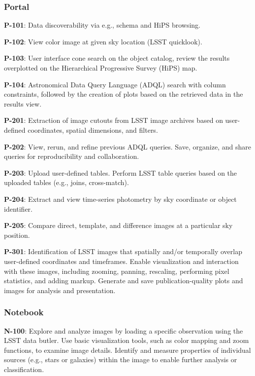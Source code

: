 
\subsubsection{Portal}

\textbf{P-101}: Data discoverability via e.g., schema and HiPS browsing. 

\textbf{P-102}: View color image at given sky location (LSST quicklook).

\textbf{P-103}: User interface cone search on the object catalog, review the results overplotted on the Hierarchical Progressive Survey (HiPS) map.

\textbf{P-104}: Astronomical Data Query Language (ADQL) search with column constraints, followed by the creation of plots based on the retrieved data in the results view.

\textbf{P-201}: Extraction of image cutouts from LSST image archives based on user-defined coordinates, spatial dimensions, and filters.

\textbf{P-202}:  View, rerun, and refine previous ADQL queries. Save, organize, and share queries for reproducibility and collaboration.

\textbf{P-203}: Upload user-defined tables. Perform LSST table queries based on the uploaded tables (e.g., joins, cross-match).

\textbf{P-204}: Extract and view time-series photometry by sky coordinate or object identifier.

\textbf{P-205}: Compare direct, template, and difference images at a particular sky position.

\textbf{P-301}: Identification of LSST images that spatially and/or temporally overlap user-defined coordinates and timeframes. Enable visualization and interaction with these images, including zooming, panning, rescaling, performing pixel statistics, and adding markup. Generate and save publication-quality plots and images for analysis and presentation.

\subsubsection{Notebook}

\textbf{N-100}: Explore and analyze images by loading a specific observation using the LSST data butler. Use basic visualization tools, such as color mapping and zoom functions, to examine image details. Identify and measure properties of individual sources (e.g., stars or galaxies) within the image to enable further analysis or classification.

